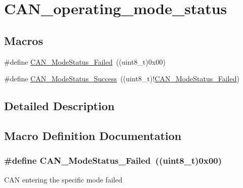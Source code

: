 \hypertarget{group___c_a_n__operating__mode__status}{\section{C\-A\-N\-\_\-operating\-\_\-mode\-\_\-status}
\label{group___c_a_n__operating__mode__status}
}
\subsection*{Macros}
\begin{DoxyCompactItemize}
\item 
\#define \hyperlink{group___c_a_n__operating__mode__status_ga9882944537945325ef08e1986838ea45}{C\-A\-N\-\_\-\-Mode\-Status\-\_\-\-Failed}~((uint8\-\_\-t)0x00)
\item 
\#define \hyperlink{group___c_a_n__operating__mode__status_ga7ca0ea503eb3b3a7c0abdfad27cb6579}{C\-A\-N\-\_\-\-Mode\-Status\-\_\-\-Success}~((uint8\-\_\-t)!\hyperlink{group___c_a_n__operating__mode__status_ga9882944537945325ef08e1986838ea45}{C\-A\-N\-\_\-\-Mode\-Status\-\_\-\-Failed})
\end{DoxyCompactItemize}


\subsection{Detailed Description}


\subsection{Macro Definition Documentation}
\hypertarget{group___c_a_n__operating__mode__status_ga9882944537945325ef08e1986838ea45}{
\subsubsection[{C\-A\-N\-\_\-\-Mode\-Status\-\_\-\-Failed}]{\setlength{\rightskip}{0pt plus 5cm}\#define C\-A\-N\-\_\-\-Mode\-Status\-\_\-\-Failed~((uint8\-\_\-t)0x00)}}\label{group___c_a_n__operating__mode__status_ga9882944537945325ef08e1986838ea45}
C\-A\-N entering the specific mode failed 

